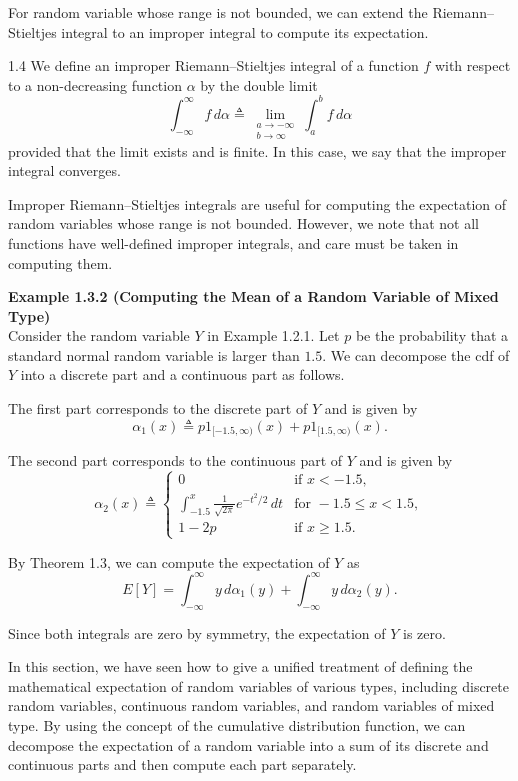 For random variable whose range is not bounded, we can extend the Riemann--Stieltjes integral to an improper integral to compute its expectation.

\begin{defbox}{1.4}
We define an improper Riemann--Stieltjes integral of a function $f$ with respect to a non-decreasing function $\alpha$ by the double limit
\[
\int_{-\infty}^{\infty} f\, d\alpha
\triangleq
\lim_{\substack{a\to -\infty\\ b\to \infty}} \int_a^b f\, d\alpha
\]
provided that the limit exists and is finite. In this case, we say that the improper integral converges.
\end{defbox}

Improper Riemann--Stieltjes integrals are useful for computing the expectation of random variables whose range is not bounded. However, we note that not all functions have well-defined improper integrals, and care must be taken in computing them.

\textbf{Example 1.3.2 (Computing the Mean of a Random Variable of Mixed Type)} \\
Consider the random variable $Y$ in Example 1.2.1. Let $p$ be the probability that a standard normal random variable is larger than $1.5$. We can decompose the cdf of $Y$ into a discrete part and a continuous part as follows.

The first part corresponds to the discrete part of $Y$ and is given by
\[
\alpha_1(x)\triangleq p1_{[-1.5,\infty)}(x)+p1_{[1.5,\infty)}(x).
\]

The second part corresponds to the continuous part of $Y$ and is given by
\[
\alpha_2(x)\triangleq
\begin{cases}
0 & \text{if } x<-1.5,\\
\int_{-1.5}^{x}\frac{1}{\sqrt{2\pi}}e^{-t^2/2}\, dt & \text{for } -1.5\le x<1.5,\\
1-2p & \text{if } x\ge 1.5.
\end{cases}
\]

By Theorem 1.3, we can compute the expectation of $Y$ as
\[
E[Y]=\int_{-\infty}^{\infty} y\, d\alpha_1(y)+\int_{-\infty}^{\infty} y\, d\alpha_2(y).
\]

Since both integrals are zero by symmetry, the expectation of $Y$ is zero.

In this section, we have seen how to give a unified treatment of defining the mathematical expectation of random variables of various types, including discrete random variables, continuous random variables, and random variables of mixed type. By using the concept of the cumulative distribution function, we can decompose the expectation of a random variable into a sum of its discrete and continuous parts and then compute each part separately.

